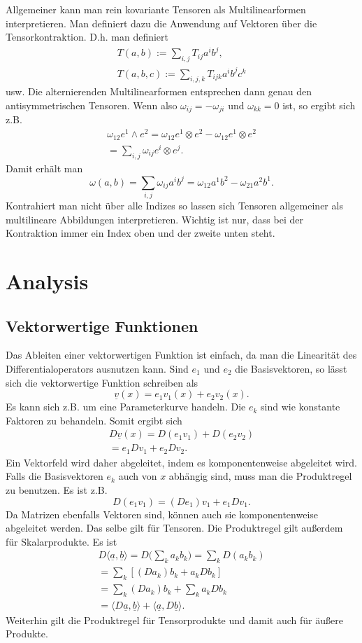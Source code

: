 \documentclass[a4paper,10pt,fleqn,twocolumn,twoside]{article}
\begin{document}
Allgemeiner kann man rein kovariante Tensoren als Multilinearformen
interpretieren. Man definiert dazu die Anwendung auf Vektoren über die
Tensorkontraktion. D.h. man definiert
\begin{gather*}
T(a,b) := \sum_{i,j} T_{ij}a^ib^j,\\
T(a,b,c) := \sum_{i,j,k} T_{ijk}a^ib^jc^k
\end{gather*}
usw. Die alternierenden Multilinearformen entsprechen dann genau
den antisymmetrischen Tensoren. Wenn also $\omega_{ij}=-\omega_{ji}$
und $\omega_{kk}=0$ ist, so ergibt sich z.B.
\begin{gather*}
\omega_{12}e^1\wedge e^2
= \omega_{12}e^1\otimes e^2-\omega_{12}e^1\otimes e^2\\
= \sum_{i,j}\omega_{ij}e^i\otimes e^j.
\end{gather*}
Damit erhält man
\[\omega(a,b) = \sum_{i,j}\omega_{ij}a^ib^j
= \omega_{12}a^1b^2-\omega_{21}a^2b^1.\]
Kontrahiert man nicht über alle Indizes so lassen sich Tensoren
allgemeiner als multilineare Abbildungen interpretieren. Wichtig ist
nur, dass bei der Kontraktion immer ein Index oben und der zweite
unten steht.

\section{Analysis}
\subsection{Vektorwertige Funktionen}

Das Ableiten einer vektorwertigen Funktion ist einfach, da man
die Linearität des Differentialoperators ausnutzen kann. Sind $e_1$
und $e_2$ die Basisvektoren, so lässt sich die vektorwertige
Funktion schreiben als
\[\underline v(x) = e_1v_1(x)+e_2v_2(x).\]
Es kann sich z.B. um eine Parameterkurve handeln. Die $e_k$ sind
wie konstante Faktoren zu behandeln. Somit ergibt sich
\begin{gather*}
D\underline v(x) = D(e_1v_1)+D(e_2v_2)\\
= e_1Dv_1+e_2Dv_2.
\end{gather*}
Ein Vektorfeld wird daher abgeleitet, indem es komponentenweise
abgeleitet wird. Falls die Basisvektoren $e_k$
auch von $x$ abhängig sind, muss man die Produktregel zu benutzen.
Es ist z.B.
\[D(e_1v_1) = (De_1)v_1+e_1Dv_1.\]
Da Matrizen ebenfalls Vektoren sind, können auch sie komponentenweise
abgeleitet werden. Das selbe gilt für Tensoren. Die Produktregel
gilt außerdem für Skalarprodukte. Es ist
\begin{gather*}D\langle\underline a,\underline b\rangle
= D\Big(\sum\nolimits_k a_kb_k\Big) = \sum\nolimits_k D(a_kb_k)\\
= \sum\nolimits_k [(Da_k)b_k+a_kDb_k]\\
= \sum\nolimits_k (Da_k)b_k + \sum\nolimits_k a_kDb_k\\
= \langle D\underline a,\underline b\rangle
+ \langle \underline a,D\underline b\rangle.
\end{gather*}
Weiterhin gilt die Produktregel für Tensorprodukte und damit auch
für äußere Produkte.
\end{document}
